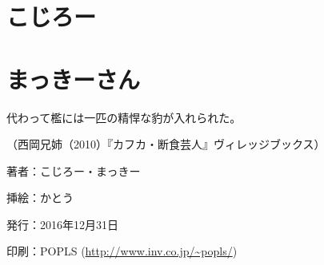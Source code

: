 \documentclass[9pt,b5paper,tombo,openany]{jsbook}
\begin{document}

\section*{こじろー}


\section*{まっきーさん}


\noindent
代わって檻には一匹の精悍な豹が入れられた。

\noindent
（西岡兄姉（2010）『カフカ・断食芸人』ヴィレッジブックス）

\begin{minipage}{0.5\paperwidth}
	著者：こじろー・まっきー

	挿絵：かとう

	発行：2016年12月31日

	印刷：POPLS (\url{http://www.inv.co.jp/~popls/})
\end{minipage}
\end{document}
